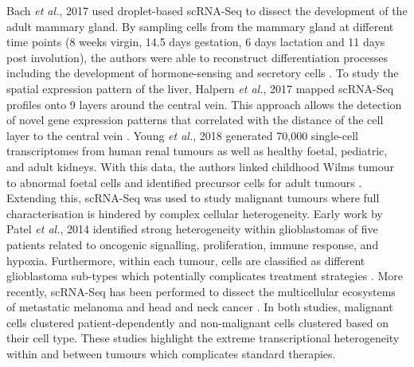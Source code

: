 Bach \emph{et al.}, 2017 used droplet-based scRNA-Seq to dissect the development of the adult mammary gland. By sampling cells from the mammary gland at different time points (8 weeks virgin, 14.5 days gestation, 6 days lactation and 11 days post involution), the authors were able to reconstruct differentiation processes including the development of hormone-sensing and secretory cells \citep{Bach2017}. To study the spatial expression pattern of the liver, Halpern \emph{et al.}, 2017 mapped scRNA-Seq profiles onto 9 layers around the central vein. This approach allows the detection of novel gene expression patterns that correlated with the distance of the cell layer to the central vein \citep{Halpern2017}. Young \emph{et al.}, 2018 generated 70,000 single-cell transcriptomes from human renal tumours as well as healthy foetal, pediatric, and adult kidneys. With this data, the authors linked childhood Wilms tumour to abnormal foetal cells and identified precursor cells for adult tumours \citep{Young2018}. \\

Extending this, scRNA-Seq was used to study malignant tumours where full characterisation is hindered by complex cellular heterogeneity. Early work by Patel \emph{et al.}, 2014 identified strong heterogeneity within glioblastomas of five patients related to oncogenic signalling, proliferation, immune response, and hypoxia. Furthermore, within each tumour, cells are classified as different glioblastoma sub-types which potentially complicates treatment strategies \citep{Patel2014}. More recently, scRNA-Seq has been performed to dissect the multicellular ecosystems of metastatic melanoma \citep{Tirosh2016} and head and neck cancer \citep{Puram2017}. In both studies, malignant cells clustered patient-dependently and non-malignant cells clustered based on their cell type. These studies highlight the extreme transcriptional heterogeneity within and between tumours which complicates standard therapies. \\

